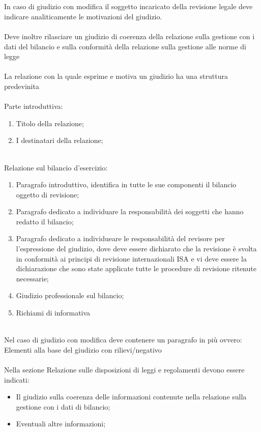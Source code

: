 \documentclass{report}
\begin{document}
\\ \\
In caso di giudizio con modifica il soggetto incaricato della revisione legale deve indicare analiticamente le motivazioni del giudizio.
\\ \\
Deve inoltre rilasciare un giudizio di coerenza della relazione sulla gestione con i dati del bilancio e sulla conformità della relazione sulla gestione alle norme di legge
\\ \\
La relazione con la quale esprime e motiva un giudizio ha una struttura predevinita 
\\
\\
Parte introduttiva:
\\
\begin{enumerate}
  \item{Titolo della relazione;}
  \item{I destinatari della relazione;}
\end{enumerate}
\\
Relazione sul bilancio d'esercizio:
\\
\begin{enumerate}
  \item{Paragrafo introduttivo, identifica in tutte le sue componenti il bilancio oggetto di revisione;}
  \item{Paragrafo dedicato a individuare la responsabilità dei soggetti che hanno redatto il bilancio;}
  \item{Paragrafo dedicato a individueare le responsabilità del revisore per l'espressione del giudizio, dove deve essere dichiarato che la revisione è svolta in conformità ai principi di revisione internazionali ISA e vi deve essere la dichiarazione che sono state applicate tutte le procedure di revisione ritenute necessarie;}
  \item{Giudizio professionale sul bilancio;}
  \item{Richiami di informativa}
\end{enumerate}
\\
Nel caso di giudizio con modifica deve contenere un paragrafo in più ovvero: Elementi alla base del giudizio con rilievi/negativo
\\
\\
Nella sezione Relazione sulle disposizioni di leggi e regolamenti devono essere indicati:
\\
\begin{itemize}
  \item{Il giudizio sulla coerenza delle informazioni contenute nella relazione sulla gestione con i dati di bilancio;}
  \item{Eventuali altre informazioni;}
\end{itemize}
\end{document}
